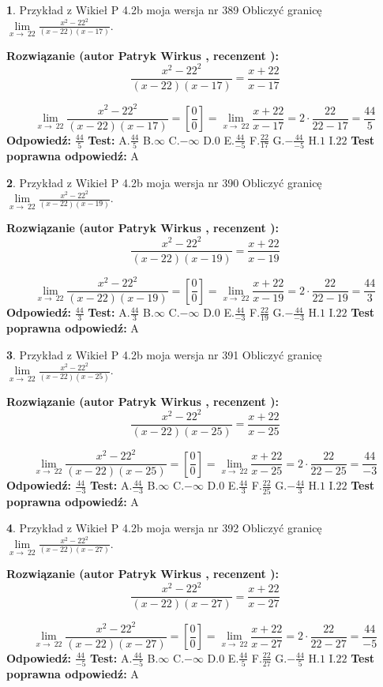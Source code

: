 \documentclass[12pt, a4paper]{article}
\theoremstyle{definition} %
\newtheorem{zad}{}
\newcommand{\zadStart}[1]{\begin{zad}#1\newline}
\newcommand{\zadStop}{\end{zad}}
\newcommand{\rozwStart}[2]{\noindent \textbf{Rozwiązanie (autor #1 , recenzent #2): }\newline}
\newcommand{\rozwStop}{\newline}
\newcommand{\odpStart}{\noindent \textbf{Odpowiedź:}\newline}
\newcommand{\odpStop}{\newline}
\newcommand{\testStart}{\noindent \textbf{Test:}\newline}
\newcommand{\testStop}{\newline}
\newcommand{\kluczStart}{\noindent \textbf{Test poprawna odpowiedź:}\newline}
\newcommand{\kluczStop}{\newline}
\begin{document}
\zadStart{Przykład z Wikieł P 4.2b moja wersja nr 389}
Obliczyć granicę $\lim\limits_{x\to\ 22}\frac{x^{2}-22^{2}}{(x-22)(x-17)}$.
\zadStop
\rozwStart{Patryk Wirkus}{}
$$\frac{x^{2}-22^{2}}{(x-22)(x-17)}=\frac{x+22}{x-17}$$

$$\lim\limits_{x\to\ 22}\frac{x^{2}-22^{2}}{(x-22)(x-17)}=[\frac{0}{0}]=\lim\limits_{x\to\ 22}\frac{x+22}{x-17}=2 \cdot \frac{22}{22-17} = \frac{44}{5}$$
\rozwStop
\odpStart
$\frac{44}{5}$
\odpStop
\testStart
A.$\frac{44}{5}$
B.$\infty$
C.$-\infty$
D.$0$
E.$\frac{44}{-5}$
F.$\frac{22}{17}$
G.$-\frac{44}{-5}$
H.$1$
I.$22$
\testStop
\kluczStart
A
\kluczStop



\zadStart{Przykład z Wikieł P 4.2b moja wersja nr 390}
Obliczyć granicę $\lim\limits_{x\to\ 22}\frac{x^{2}-22^{2}}{(x-22)(x-19)}$.
\zadStop
\rozwStart{Patryk Wirkus}{}
$$\frac{x^{2}-22^{2}}{(x-22)(x-19)}=\frac{x+22}{x-19}$$

$$\lim\limits_{x\to\ 22}\frac{x^{2}-22^{2}}{(x-22)(x-19)}=[\frac{0}{0}]=\lim\limits_{x\to\ 22}\frac{x+22}{x-19}=2 \cdot \frac{22}{22-19} = \frac{44}{3}$$
\rozwStop
\odpStart
$\frac{44}{3}$
\odpStop
\testStart
A.$\frac{44}{3}$
B.$\infty$
C.$-\infty$
D.$0$
E.$\frac{44}{-3}$
F.$\frac{22}{19}$
G.$-\frac{44}{-3}$
H.$1$
I.$22$
\testStop
\kluczStart
A
\kluczStop



\zadStart{Przykład z Wikieł P 4.2b moja wersja nr 391}
Obliczyć granicę $\lim\limits_{x\to\ 22}\frac{x^{2}-22^{2}}{(x-22)(x-25)}$.
\zadStop
\rozwStart{Patryk Wirkus}{}
$$\frac{x^{2}-22^{2}}{(x-22)(x-25)}=\frac{x+22}{x-25}$$

$$\lim\limits_{x\to\ 22}\frac{x^{2}-22^{2}}{(x-22)(x-25)}=[\frac{0}{0}]=\lim\limits_{x\to\ 22}\frac{x+22}{x-25}=2 \cdot \frac{22}{22-25} = \frac{44}{-3}$$
\rozwStop
\odpStart
$\frac{44}{-3}$
\odpStop
\testStart
A.$\frac{44}{-3}$
B.$\infty$
C.$-\infty$
D.$0$
E.$\frac{44}{3}$
F.$\frac{22}{25}$
G.$-\frac{44}{3}$
H.$1$
I.$22$
\testStop
\kluczStart
A
\kluczStop



\zadStart{Przykład z Wikieł P 4.2b moja wersja nr 392}
Obliczyć granicę $\lim\limits_{x\to\ 22}\frac{x^{2}-22^{2}}{(x-22)(x-27)}$.
\zadStop
\rozwStart{Patryk Wirkus}{}
$$\frac{x^{2}-22^{2}}{(x-22)(x-27)}=\frac{x+22}{x-27}$$

$$\lim\limits_{x\to\ 22}\frac{x^{2}-22^{2}}{(x-22)(x-27)}=[\frac{0}{0}]=\lim\limits_{x\to\ 22}\frac{x+22}{x-27}=2 \cdot \frac{22}{22-27} = \frac{44}{-5}$$
\rozwStop
\odpStart
$\frac{44}{-5}$
\odpStop
\testStart
A.$\frac{44}{-5}$
B.$\infty$
C.$-\infty$
D.$0$
E.$\frac{44}{5}$
F.$\frac{22}{27}$
G.$-\frac{44}{5}$
H.$1$
I.$22$
\testStop
\kluczStart
A
\kluczStop
\end{document}
